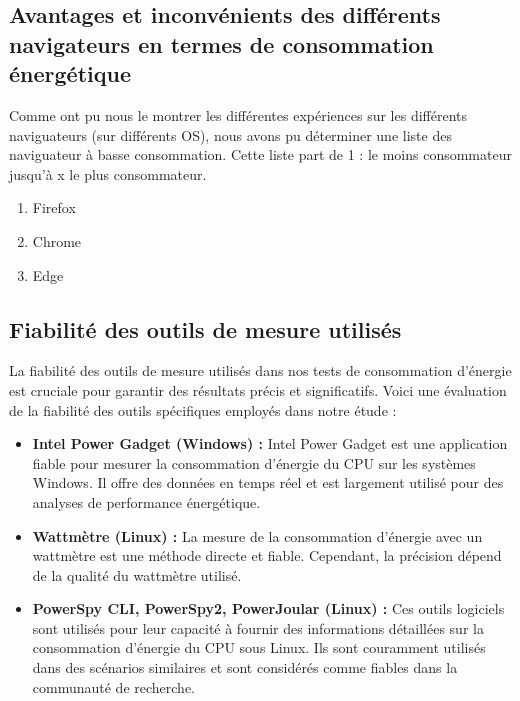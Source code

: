 \documentclass[12pt, a4paper]{report}
\begin{document}
\subsection{Avantages et inconvénients des différents navigateurs en termes de consommation énergétique}
Comme ont pu nous le montrer les différentes expériences sur les différents naviguateurs (sur différents OS), nous avons pu déterminer une liste des naviguateur à basse consommation. Cette liste part de 1 : le moins consommateur jusqu'à x %
le plus consommateur.
\begin{enumerate}
    \item Firefox
    \item Chrome
    \item Edge
\end{enumerate}

\subsection{Fiabilité des outils de mesure utilisés}

La fiabilité des outils de mesure utilisés dans nos tests de consommation d'énergie est cruciale pour garantir des résultats précis et significatifs. Voici une évaluation de la fiabilité des outils spécifiques employés dans notre étude :

\begin{itemize}
    \item {\bfseries Intel Power Gadget (Windows) :} Intel Power Gadget est une application fiable pour mesurer la consommation d'énergie du CPU sur les systèmes Windows. Il offre des données en temps réel et est largement utilisé pour des analyses de performance énergétique.

    \item {\bfseries Wattmètre (Linux) :} La mesure de la consommation d'énergie avec un wattmètre est une méthode directe et fiable. Cependant, la précision dépend de la qualité du wattmètre utilisé.

    \item {\bfseries PowerSpy CLI, PowerSpy2, PowerJoular (Linux) :}  Ces outils logiciels sont utilisés pour leur capacité à fournir des informations détaillées sur la consommation d'énergie du CPU sous Linux. Ils sont couramment utilisés dans des scénarios similaires et sont considérés comme fiables dans la communauté de recherche.
    
\end{itemize}
\end{document}
